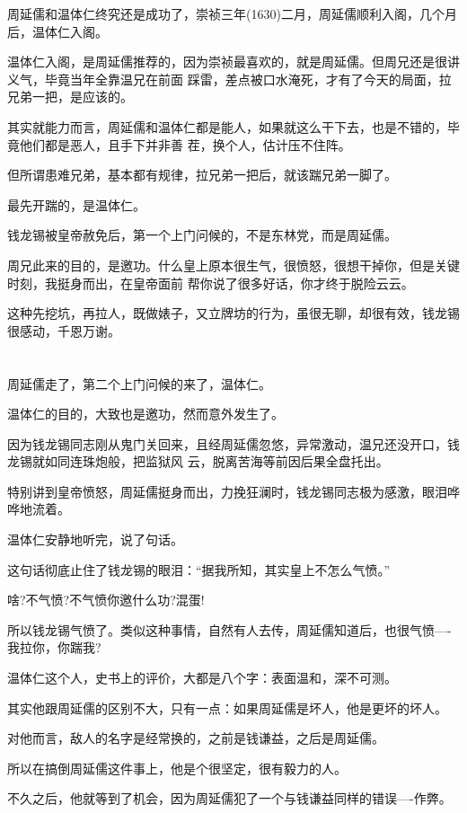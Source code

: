 \documentclass[11pt,a4paper,onecolumn]{article}
\begin{document}
周延儒和温体仁终究还是成功了，崇祯三年(1630)二月，周延儒顺利入阁，几个月后，温体仁入阁。

温体仁入阁，是周延儒推荐的，因为崇祯最喜欢的，就是周延儒。但周兄还是很讲义气，毕竟当年全靠温兄在前面
踩雷，差点被口水淹死，才有了今天的局面，拉兄弟一把，是应该的。

其实就能力而言，周延儒和温体仁都是能人，如果就这么干下去，也是不错的，毕竟他们都是恶人，且手下并非善
茬，换个人，估计压不住阵。

但所谓患难兄弟，基本都有规律，拉兄弟一把后，就该踹兄弟一脚了。

最先开踹的，是温体仁。

钱龙锡被皇帝赦免后，第一个上门问候的，不是东林党，而是周延儒。

周兄此来的目的，是邀功。什么皇上原本很生气，很愤怒，很想干掉你，但是关键时刻，我挺身而出，在皇帝面前
帮你说了很多好话，你才终于脱险云云。

这种先挖坑，再拉人，既做婊子，又立牌坊的行为，虽很无聊，却很有效，钱龙锡很感动，千恩万谢。

\section[\thesection]{}

周延儒走了，第二个上门问候的来了，温体仁。

温体仁的目的，大致也是邀功，然而意外发生了。

因为钱龙锡同志刚从鬼门关回来，且经周延儒忽悠，异常激动，温兄还没开口，钱龙锡就如同连珠炮般，把监狱风
云，脱离苦海等前因后果全盘托出。

特别讲到皇帝愤怒，周延儒挺身而出，力挽狂澜时，钱龙锡同志极为感激，眼泪哗哗地流着。

温体仁安静地听完，说了句话。

这句话彻底止住了钱龙锡的眼泪：``据我所知，其实皇上不怎么气愤。''

啥?不气愤?不气愤你邀什么功?混蛋!

所以钱龙锡气愤了。类似这种事情，自然有人去传，周延儒知道后，也很气愤----我拉你，你踹我?

温体仁这个人，史书上的评价，大都是八个字：表面温和，深不可测。

其实他跟周延儒的区别不大，只有一点：如果周延儒是坏人，他是更坏的坏人。

对他而言，敌人的名字是经常换的，之前是钱谦益，之后是周延儒。

所以在搞倒周延儒这件事上，他是个很坚定，很有毅力的人。

不久之后，他就等到了机会，因为周延儒犯了一个与钱谦益同样的错误----作弊。
\end{document}
